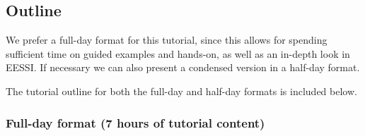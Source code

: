 \subsection*{Outline}


We prefer a full-day format for this tutorial, since this allows for spending sufficient time
on guided examples and hands-on, as well as an in-depth look in EESSI. If necessary we can also
present a condensed version in a half-day format.

The tutorial outline for both the full-day and half-day formats is included below.

\subsubsection*{Full-day format (7 hours of tutorial content)}

